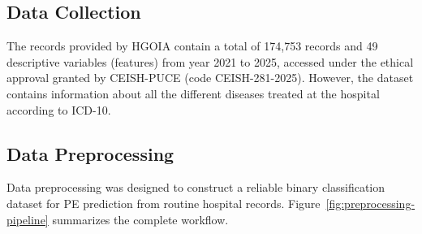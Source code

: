 \documentclass[diagnostics,article,accept,pdftex,moreauthors]{Definitions/mdpi}
\begin{document}
\subsection{Data Collection}
\label{sec:data-collection}
The records provided by \ac{HGOIA} contain a total of {174,753} records and 49
descriptive variables (features) from year 2021 to 2025, accessed
under the ethical approval granted by CEISH-\ac{PUCE} (code
CEISH-281-2025). However, the dataset contains information about all
the different diseases treated at the hospital according to
\ac{ICD-10}.

\subsection{Data Preprocessing}
\label{sec:data-preprocessing}

Data preprocessing was designed to construct a reliable binary
classification dataset for \ac{PE} prediction from routine
hospital records. Figure~\ref{fig:preprocessing-pipeline} summarizes
the complete workflow.
\end{document}
